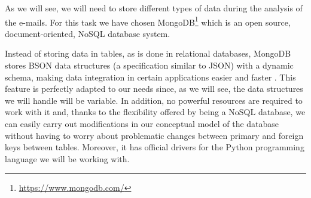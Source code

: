 As we will see, we will need to store different types of data during the analysis of the e-mails. For this task we have chosen MongoDB\footnote{\url{https://www.mongodb.com/}} which is an open source, document-oriented, NoSQL database system.

Instead of storing data in tables, as is done in relational databases, MongoDB stores BSON data structures (a specification similar to JSON) with a dynamic schema, making data integration in certain applications easier and faster \citep{gyHorodi2015comparative}. This feature is perfectly adapted to our needs since, as we will see, the data structures we will handle will be variable. In addition, no powerful resources are required to work with it and, thanks to the flexibility offered by being a NoSQL database, we can easily carry out modifications in our conceptual model of the database without having to worry about problematic changes between primary and foreign keys between tables. Moreover, it has official drivers for the Python programming language we will be working with.